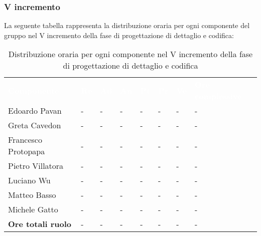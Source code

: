 \subsubsection{V incremento}
La seguente tabella rappresenta la distribuzione oraria per ogni componente del gruppo nel V incremento della fase di progettazione di dettaglio e codifica:
\begin{table}[!htbp]
\begin{center}
\renewcommand{\arraystretch}{1.25}
\begin{tabular}{ m{}<{\centering}  m{}<{\centering} m{}<{\centering} m{}<{\centering}  m{}<{\centering}  m{}<{\centering}  m{}<{\centering}  m{}<{\centering}   }
	\rowcolor{darkblue}
	\textcolor{white}{\textbf{Componente}} &\textcolor{white}{\textbf{Re}}&\textcolor{white}{\textbf{Ad}}&\textcolor{white}{\textbf{An}}&\textcolor{white}{\textbf{Pt}}&\textcolor{white}{\textbf{Pr}}&\textcolor{white}{\textbf{Ve}}&\textcolor{white}{\textbf{Ore complessive}}\\ 

	Edoardo Pavan & - & - & - & - & - & - & -\\	

	\rowcolor{gray!10} Greta Cavedon & - & - & - & - & - & - & -\\
	
	Francesco Protopapa & - & - & - & - & - & - & -\\
	
	\rowcolor{gray!10} Pietro Villatora & - & - & - & - & - & - & -\\
	
	Luciano Wu & - & - & - & - & - & - & -\\
	
	\rowcolor{gray!10} Matteo Basso & - & - & - & - & - & - & -\\
	
	Michele Gatto & - & - & - & - & - & - & -\\
	
	\rowcolor{gray!10} \textbf{Ore totali ruolo} & - & - & - & - & - & - & -\\

\end{tabular}
\caption{Distribuzione oraria per ogni componente nel V incremento della fase di progettazione di dettaglio e codifica}
\end{center}
\end{table}

